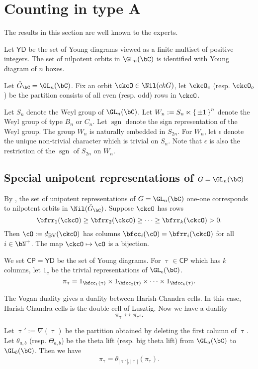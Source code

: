 \documentclass[12pt,a4paper]{amsart}
\def\abs#1{\left|{#1}\right|}
\newcommand{\CP}{{\mathcal {P}}}
\newcommand{\sgn}{\operatorname{sgn}}
\def\DD{\nabla}
\numberwithin{equation}{section}
\theoremstyle{remark}
\def\ckGc{\check{G}_{\bC}}
\def\dBV{d_{\mathrm{BV}}}
\def\CP{\mathsf{CP}}
\def\YD{\mathsf{YD}}
\def\DD{\nabla}
\begin{document}
\section{Counting in type A}
The results in this section are well known to the experts.


Let $\YD$ be the set of Young diagrams viewed as a finite multiset of positive integers. 
The set of nilpotent orbits in $\GL_n(\bC)$ is identified with Young diagram of $n$ boxes.


Let $\ckGc = \GL_n(\bC)$. 
Fix
an orbit $\ckcO\in \Nil(ckG)$, let $\ckcO_e$ (resp. $\ckcO_o$) be the partition
consists of all even (resp. odd) rows in $\ckcO$.

Let $S_n$ denote the Weyl group of $\GL_n(\bC)$.
Let $W_n := S_n \ltimes \set{\pm 1}^n$ denote the Weyl group of type $B_n$ or $C_n$.  
Let $\sgn$ denote the sign representation of the Weyl group. 
The group $W_n$ is naturally embedded in $S_{2n}$.
For $W_n$, let $\epsilon$ denote the unique non-trivial character which is trivial on $S_n$. 
Note that $\epsilon$ is also the restriction of the $\sgn$ of $S_{2n}$ on $W_n$. 


\subsection{Special unipotent representations of $G = \GL_n(\bC)$}
By \cite{BVUni}, the set of unipotent representations
of $G = \GL_n(\bC)$ one-one corresponds to nilpotent orbits in $\Nil(\ckGc)$. 
Suppose $\ckcO$ has rows 
\[
\bfrr_1(\ckcO)\geq \bfrr_2(\ckcO)\geq \cdots\geq 
\bfrr_k(\ckcO) >0. 
\]
Then $\cO := \dBV(\ckcO)$ has columns $\bfcc_i(\cO) = \bfrr_i(\ckcO)$ for all 
$i\in \bN^+$. 
The map $\ckcO \mapsto \cO$ is a bijection.


We set $\CP =  \YD$ be the set of Young diagrams. 
For $\uptau \in \CP$ which has $k$ columns,
let $1_{c}$ be the trivial representations of $\GL_c(\bC)$. 
\[
 \pi_\uptau = 1_{\bfcc_1(\uptau)}\times  1_{\bfcc_2(\uptau)}\times \cdots 
 \times 1_{\bfcc_k(\uptau)}.
\]

The Vogan duality gives a duality between Harish-Chandra cells. 
In this case, Harish-Chandra cells is the double cell  
of Lusztig.  
Now we have a duality 
\[
 \pi_\uptau \leftrightarrow \pi_{\uptau^t}. 
\]

Let $\uptau' := \DD(\uptau)$ be the partition obtained by deleting the first column 
of $\uptau$. 
Let $\theta_{a,b}$ (resp. $\Theta_{a,b}$) be the  theta lift (resp. big theta lift) from $\GL_a(\bC)$ to  
$\GL_b(\bC)$. 
Then we have 
\[
  \pi_{\uptau} = \theta_{{\abs{\uptau'}},{\abs{\uptau}}} (\pi_{\uptau}). 
\]
\end{document}
